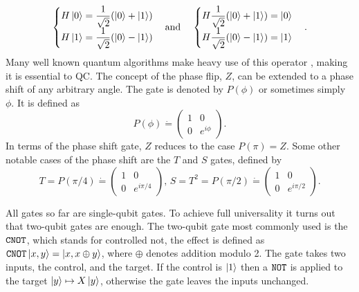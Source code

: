\begin{equation}
\begin{cases}
H\ket{0} = \dfrac{1}{\sqrt{2}}(\ket{0} + \ket{1})
\\
H\ket{1} = \dfrac{1}{\sqrt{2}}(\ket{0} - \ket{1})
\end{cases}
\text{and}\hspace{4mm}
\begin{cases}
H\dfrac{1}{\sqrt{2}}(\ket{0} + \ket{1}) = \ket{0}
\\
H\dfrac{1}{\sqrt{2}}(\ket{0} - \ket{1}) = \ket{1}
\end{cases}.
\end{equation}
Many well known quantum algorithms make heavy use of this operator \cite{Grover,shor}, making it is essential to QC.
The concept of the phase flip, $Z$, can be extended to a phase shift of any arbitrary angle. The gate is denoted by $P(\phi)$ or sometimes simply $\phi$. It is defined as 
\begin{equation}
P(\phi) \dot{=} \begin{pmatrix}
1 & 0 \\
0 & e^{i\phi}
\end{pmatrix}.
\end{equation}
In terms of the phase shift gate, $Z$ reduces to the case $P(\pi) = Z$. Some other notable cases of the phase shift are the $T$ and $S$ gates, defined by
\begin{equation}
T = P({\pi/4}) \dot{=} \begin{pmatrix}
1 & 0 \\ 0 & e^{i\pi/4}
\end{pmatrix},\, S = T^2 = P({\pi/2}) \dot{=} \begin{pmatrix}
1 & 0 \\ 0 & e^{i\pi/2}
\end{pmatrix}.
\end{equation}

All gates so far are single-qubit gates. To achieve full universality it turns out that two-qubit gates are enough. The two-qubit gate most commonly used is the ${\tt CNOT}$, which stands for controlled not, the effect is defined as ${\tt CNOT}\ket{x,y} = \ket{x,x\oplus y}$, where $\oplus$ denotes addition modulo 2. The gate takes two inputs, the control, and the target. If the control is $\ket{1}$ then a ${\tt NOT}$ is applied to the target $\ket{y} \mapsto X\ket{y}$, otherwise the gate leaves the inputs unchanged.



